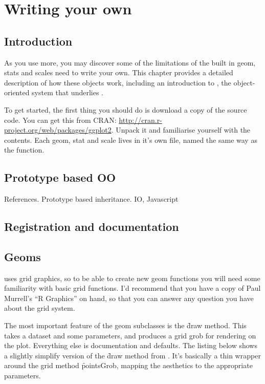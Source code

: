 

\chapter{Writing your own}

\section{Introduction}

As you use \ggplot more, you may discover some of the limitations of the built in geom, stats and scales need to write your own.  This chapter provides a detailed description of how these objects work, including an introduction to , the object-oriented system that underlies \ggplot.

To get started, the first thing you should do is download a copy of the source code.  You can get this from CRAN: \url{http://cran.r-project.org/web/packages/ggplot2}.  Unpack it and familiarise yourself with the contents.  Each geom, stat and scale lives in it's own file, named the same way as the function.  

\section{Prototype based OO} %
\label{sec:proto}

References.
Prototype based inheritance.  IO, Javascript

\section{Registration and documentation}

\section{Geoms}
\label{sec:own-geom}

\ggplot uses grid graphics, so to be able to create new geom functions you will need some familiarity with basic grid functions.  I'd recommend that you have a copy of Paul Murrell's ``R Graphics'' on hand, so that you can answer any question you have about the grid system.

The most important feature of the geom subclasses is the \f{draw} method.  This takes a dataset and some parameters, and produces a grid grob for rendering on the plot.  Everything else is documentation and defaults.  The listing below shows a slightly simplify version of the \f{draw} method from .  It's basically a thin wrapper around the grid method \f{pointsGrob}, mapping the aesthetics to the appropriate parameters.

